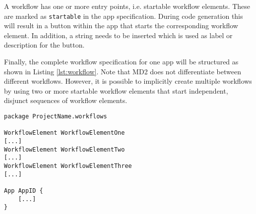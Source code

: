 A workflow has one or more entry points, i.e. startable workflow elements. These are marked as {\lstinline!startable!} in the app specification. During code generation this will result in a button within the app that starts the corresponding workflow element. In addition, a string needs to be inserted which is used as label or description for the button.

Finally, the complete workflow specification for one app will be structured as shown in Listing \ref{lst:workflow}. Note that MD2 does not differentiate between different workflows. However, it is possible to implicitly create multiple workflows by using two or more startable workflow elements that start independent, disjunct sequences of workflow elements.

\begin{lstlisting}[language=MD2, label=lst:workflow, caption=Workflow Definition in MD2]
package ProjectName.workflows

WorkflowElement WorkflowElementOne
[...]
WorkflowElement WorkflowElementTwo
[...]
WorkflowElement WorkflowElementThree
[...]

App AppID {
	[...]
}
\end{lstlisting}